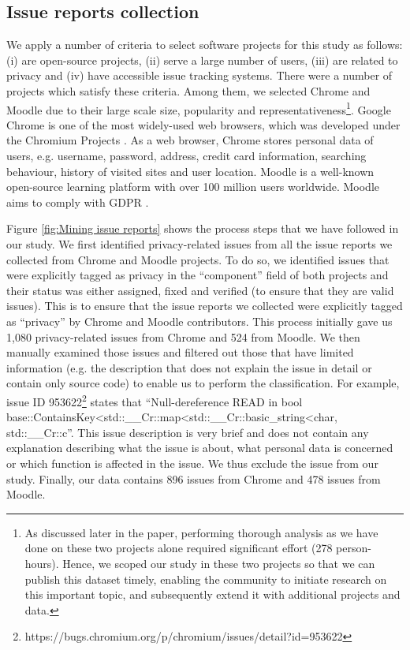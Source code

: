 \subsection{Issue reports collection}

We apply a number of criteria to select software projects for this study as follows: (i) are open-source projects, (ii) serve a large number of users, (iii) are related to privacy and (iv) have accessible issue tracking systems. There were a number of projects which satisfy these criteria. Among them, we selected Chrome and Moodle due to their large scale size, popularity and representativeness\footnote{As discussed later in the paper, performing thorough analysis as we have done on these two projects alone required significant effort (278 person-hours). Hence, we scoped our study in these two projects so that we can publish this dataset timely, enabling the community to initiate research on this important topic, and subsequently extend it with additional projects and data.}. Google Chrome is one of the most widely-used web browsers, which was developed under the Chromium Projects \cite{Projects}. As a web browser, Chrome stores personal data of users, e.g. username, password, address, credit card information, searching behaviour, history of visited sites and user location. Moodle is a well-known open-source learning platform \cite{Moodle} with over 100 million users worldwide. Moodle aims to comply with GDPR \cite{Moodle2019}.

Figure \ref{fig:Mining issue reports} shows the process steps that we have followed in our study. We first identified privacy-related issues from all the issue reports we collected from Chrome and Moodle projects. To do so, we identified issues that were explicitly tagged as privacy in the ``component'' field of both projects and their status was either assigned, fixed and verified (to ensure that they are valid issues). This is to ensure that the issue reports we collected were explicitly tagged as ``privacy'' by Chrome and Moodle contributors. This process initially gave us 1,080 privacy-related issues from Chrome and 524 from Moodle. We then manually examined those issues and filtered out those that have limited information (e.g. the description that does not explain the issue in detail or contain only source code) to enable us to perform the classification. For example, issue ID 953622\footnote{https://bugs.chromium.org/p/chromium/issues/detail?id=953622} states that ``Null-dereference READ in bool base::ContainsKey<std::\_\_Cr::map<std::\_\_Cr::basic\_string<char, std::\_\_Cr::c''. This issue description is very brief and does not contain any explanation describing what the issue is about, what personal data is concerned or which function is affected in the issue. We thus exclude the issue from our study. Finally, our data contains 896 issues from Chrome and 478 issues from Moodle.

